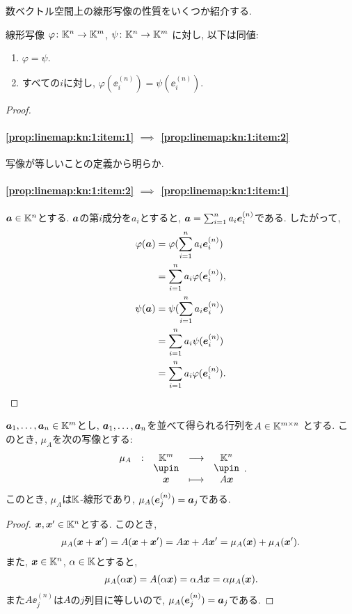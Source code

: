 数ベクトル空間上の線形写像の性質をいくつか紹介する.
\begin{prop}
\label{prop:linmap:kn:1}
線形写像
$\varphi\colon \mathbb{K}^n \to \mathbb{K}^m$,
$\psi\colon \mathbb{K}^n \to \mathbb{K}^m$
に対し, 以下は同値:
\begin{enumerate}
\item
\label{prop:linemap:kn:1:item:1}
$\varphi=\psi$.
\item
\label{prop:linemap:kn:1:item:2}
すべての$i$に対し, $\varphi(\ee^{(n)}_i)=\psi(\ee^{(n)}_i)$.
\end{enumerate}
\end{prop}
\begin{proof}
\paragraph{\ref{prop:linemap:kn:1:item:1} $\implies$ \ref{prop:linemap:kn:1:item:2}}
写像が等しいことの定義から明らか.

\paragraph{\ref{prop:linemap:kn:1:item:2} $\implies$ \ref{prop:linemap:kn:1:item:1}}
$\boldsymbol{a}\in \mathbb{K}^n$とする.
$\boldsymbol{a}$の第$i$成分を$a_i$とすると,
$\boldsymbol{a}=\sum_{i=1}^n a_i\boldsymbol{e}_i^{(n)}$である.
したがって,
\begin{align*}
\varphi(\boldsymbol{a})
&=\varphi(\sum_{i=1}^n a_i\boldsymbol{e}_i^{(n)})\\
&=\sum_{i=1}^n a_i\varphi(\boldsymbol{e}_i^{(n)}),
\\
\psi(\boldsymbol{a})
&=\psi(\sum_{i=1}^n a_i\boldsymbol{e}_i^{(n)})\\
&=\sum_{i=1}^n a_i\psi(\boldsymbol{e}_i^{(n)})\\
&=\sum_{i=1}^n a_i\varphi(\boldsymbol{e}_i^{(n)}).
\end{align*}
\end{proof}

\begin{prop}
\label{prop:linmap:kn:2}
  $\boldsymbol{a}_1,\ldots, \boldsymbol{a}_n \in \mathbb{K}^m$とし,
  $\boldsymbol{a}_1,\ldots, \boldsymbol{a}_n $を並べて得られる行列を$A\in\mathbb{K}^{m\times n}$
  とする.
  このとき, $\mu_A$を次の写像とする:
  \begin{align*}
    \shazo{\mu_A}{\KK^m}{\KK^n}{\xx}{A\xx}.
  \end{align*}
  このとき, $\mu_A$は$\mathbb{K}$-線形であり,
   $\mu_A(\boldsymbol{e}^{(n)}_j)=\boldsymbol{a}_j$である.
\end{prop}
\begin{proof}
$\boldsymbol{x},\boldsymbol{x}'\in \mathbb{K}^n$とする.
このとき,
\begin{align*}
\mu_A(\boldsymbol{x}+\boldsymbol{x}')=A(\boldsymbol{x}+\boldsymbol{x}')=A\boldsymbol{x}+A\boldsymbol{x}'=\mu_A(\boldsymbol{x})+\mu_A(\boldsymbol{x}').
\end{align*}
また,
$\boldsymbol{x}\in\mathbb{K}^n$, $\alpha\in\mathbb{K}$とすると,
\begin{align*}
\mu_A(\alpha\boldsymbol{x})=A(\alpha\boldsymbol{x})=\alpha A\boldsymbol{x}=\alpha\mu_A(\boldsymbol{x}).
\end{align*}
また$A\ee^{(n)}_j$は$A$の$j$列目に等しいので,
   $\mu_A(\boldsymbol{e}^{(n)}_j)=\boldsymbol{a}_j$である.
\end{proof}

